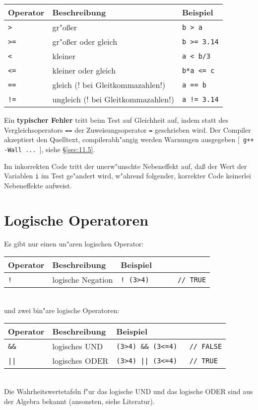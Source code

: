 \begin{tabular} {l@{\quad}p{}@{\quad}l}
 Operator & Beschreibung & Beispiel \\ \hline
 \verb|>| & gr"o{\ss}er & \verb|b > a| \\
 \verb|>=| & gr"o{\ss}er oder gleich & \verb|b >= 3.14| \\
 \verb|<| & kleiner & \verb|a < b/3| \\
 \verb|<=| & kleiner oder gleich & \verb|b*a <= c| \\
 \verb|==| & gleich (! bei Gleitkommazahlen!)& \verb|a == b| \\
 \verb|!=| & ungleich (! bei Gleitkommazahlen!)& \verb|a != 3.14|
\end{tabular}
%
%
Ein \textbf{typischer Fehler} tritt beim Test auf Gleichheit auf, indem
statt des Vergleichsoperators \verb|==| der Zuweisungsoperator
\verb|=| geschrieben wird. Der Compiler akzeptiert den
Quelltext, compilerabh"angig werden Warnungen ausgegeben [\verb| g++ -Wall ... |],
siehe \S\ref{sec:11.5}.
%

Im inkorrekten Code tritt der unerw"unschte Nebeneffekt auf,
da{\ss} der Wert der Variablen \verb|i| im Test ge"andert wird,
w"ahrend folgender, korrekter Code keinerlei Nebeneffekte aufweist.
\enlargethispage{1ex}
%
\section{Logische Operatoren}
\label{p:3.4}
%
Es gibt nur einen un"aren logischen Operator:\\[0.5ex]
%
\begin{tabular} {l@{\quad}p{}@{\quad}l}
 Operator & Beschreibung & Beispiel \\ \hline
 \verb|!|	& logische Negation & \verb|! (3>4)       // TRUE|
\end{tabular}\\[0.5ex]
%
und zwei bin"are logische Operatoren:\\[0.5ex]
%
%
\begin{tabular} {l@{\quad}p{}@{\quad}l}
 Operator & Beschreibung & Beispiel \\ \hline
 \verb|&&| & logisches UND  & \verb|(3>4) && (3<=4)   // FALSE| \\
 \verb!||! & logisches ODER & \verb!(3>4) || (3<=4)   // TRUE!
\end{tabular}
\\[0.5ex]
Die Wahrheitswertetafeln f"ur das logische UND und das logische ODER
sind aus der Algebra bekannt (ansonsten, siehe Literatur).
%
%
%
%
